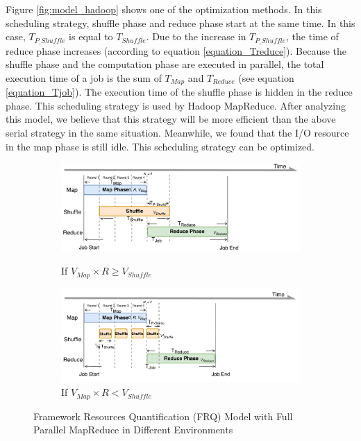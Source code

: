 {Figure \ref{fig:model_hadoop} shows one of the optimization methods. In this scheduling strategy, shuffle phase and reduce phase start at the same time. In this case, \(T_{P\_Shuffle}\) is equal to \(T_{Shuffle}\). Due to the increase in \(T_{P\_Shuffle}\), the time of reduce phase increases (according to equation \ref{equation_Treduce}). Because the shuffle phase and the computation phase are executed in parallel, the total execution time of a job is the sum of \(T_{Map}\) and \(T_{Reduce}\) (see equation \ref{equation_Tjob}). The execution time of the shuffle phase is hidden in the reduce phase. This scheduling strategy is used by Hadoop MapReduce. After analyzing this model, we believe that this strategy will be more efficient than the above serial strategy in the same situation. Meanwhile, we found that the I/O resource in the map phase is still idle. This scheduling strategy can be optimized.

\begin{figure}
	\centering
	\begin{minipage}[hb]{\linewidth}
		\begin{subfigure}{\linewidth}
			\begin{minipage}{\linewidth}
				\includegraphics[width=\linewidth]{fig/model_scache1}
				\caption{\color{blue}If \(V_{Map} \times R \ge V_{Shuffle}\)}
				\label{fig:model_scache1}
			\end{minipage}
			\begin{minipage}{\linewidth}
				\includegraphics[width=\linewidth]{fig/model_scache2}
				\caption{\color{blue}If \(V_{Map} \times R < V_{Shuffle}\)}
				\label{fig:model_scache2}
			\end{minipage}
		\end{subfigure}
		\caption{\color{blue}Framework Resources Quantification (FRQ) Model with Full Parallel MapReduce in Different Environments}
		\label{fig:model_scache}
	\end{minipage}
\end{figure}

}
